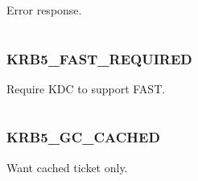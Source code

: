 \documentclass[letterpaper,10pt,english]{sphinxmanual}
\begin{document}
\begin{fulllineitems}
\label{appdev/refs/macros/KRB5_ERROR:KRB5_ERROR}
\end{fulllineitems}


Error response.

\begin{tabulary}{\linewidth}{|L|L|}
\hline

 & 
\\\hline
\end{tabulary}



\subsubsection{KRB5\_FAST\_REQUIRED}
\label{appdev/refs/macros/KRB5_FAST_REQUIRED:krb5-fast-required}\label{appdev/refs/macros/KRB5_FAST_REQUIRED:krb5-fast-required-data}\label{appdev/refs/macros/KRB5_FAST_REQUIRED::doc}

\begin{fulllineitems}
\label{appdev/refs/macros/KRB5_FAST_REQUIRED:KRB5_FAST_REQUIRED}
\end{fulllineitems}


Require KDC to support FAST.

\begin{tabulary}{\linewidth}{|L|L|}
\hline

 & 
\\\hline
\end{tabulary}



\subsubsection{KRB5\_GC\_CACHED}
\label{appdev/refs/macros/KRB5_GC_CACHED:krb5-gc-cached}\label{appdev/refs/macros/KRB5_GC_CACHED:krb5-gc-cached-data}\label{appdev/refs/macros/KRB5_GC_CACHED::doc}

\begin{fulllineitems}
\label{appdev/refs/macros/KRB5_GC_CACHED:KRB5_GC_CACHED}
\end{fulllineitems}


Want cached ticket only.
\end{document}
